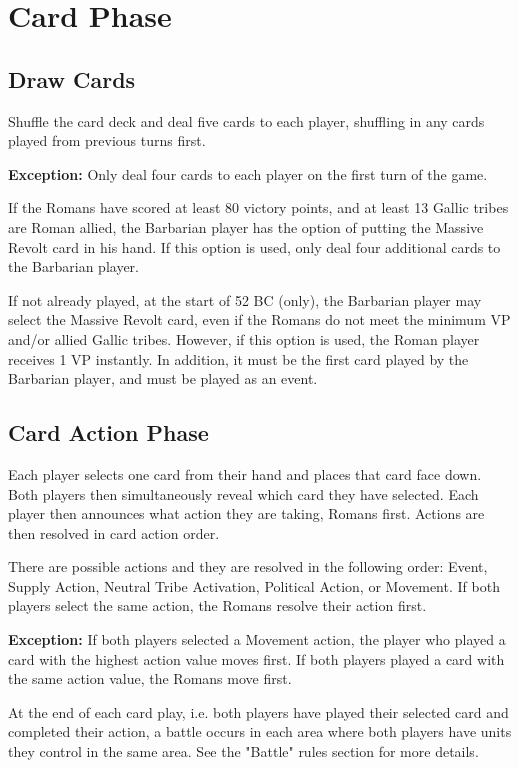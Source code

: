 \section{Card Phase}
\subsection{Draw Cards}
Shuffle the card deck and deal five cards to each player, shuffling in any cards played from previous turns first.

\textbf{Exception:} Only deal four cards to each player on the first turn of the game.

If the Romans have scored at least 80 victory points, and at least 13 Gallic tribes are Roman allied, the Barbarian player has the option of putting the Massive Revolt card in his hand. If this option is used, only deal four additional cards to the Barbarian player.

If not already played, at the start of 52 BC (only), the Barbarian player may select the Massive Revolt card, even if the Romans do not meet the minimum VP and/or allied Gallic tribes. However, if this option is used, the Roman player receives 1 VP instantly. In addition, it must be the first card played by the Barbarian player, and must be played as an event.

\subsection{Card Action Phase}
Each player selects one card from their hand and places that card face down. Both players then simultaneously reveal which card they have selected. Each player then announces what action they are taking, Romans first. Actions are then resolved in card action order.

There are possible actions and they are resolved in the following order: Event, Supply Action, Neutral Tribe Activation, Political Action, or Movement. If both players select the same action, the Romans resolve their action first.

\textbf{Exception:} If both players selected a Movement action, the player who played a card with the highest action value moves first. If both players played a card with the same action value, the Romans move first.

At the end of each card play, i.e. both players have played their selected card and completed their action, a battle occurs in each area where both players have units they control in the same area. See the "Battle" rules section for more details.

